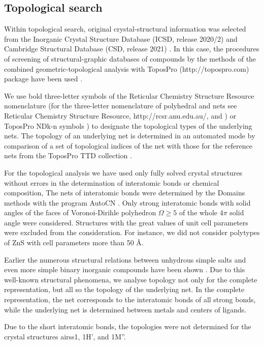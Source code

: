 \documentclass[a4paperm]{article}
\begin{document}
\subsection*{Topological search}

Within topological search, original crystal-structural information was selected from the Inorganic Crystal Structure Database (ICSD, release 2020/2) \cite{icsd_1} and Cambridge Structural Database (CSD, release 2021) \cite{icsd_2}.
In this case, the procedures of screening of structural-graphic databases of compounds by the methods of the combined geometric-topological analysis with ToposPro (http://topospro.com) package have been used \cite{topos_1}. 

We use bold three-letter symbols of the Reticular Chemistry Structure Resource nomenclature (for the three-letter nomenclature of polyhedral and nets see Reticular Chemistry Structure Resource, http://rcsr.anu.edu.au/, and \cite{rcsr}) or ToposPro NDk-n symbols \cite{rcsr_2}) to designate the topological types of the underlying nets. 
The topology of an underlying net is determined in an automated mode by comparison of a set of topological indices of the net with those for the reference nets from the ToposPro TTD collection \cite{TTD}.

For the topological analysis we have used only fully solved crystal structures without errors in the determination of interatomic bonds or chemical composition,
The nets of interatomic bonds were determined by the Domains methods with the program AutoCN \cite{blatov2016_rods}. 
Only strong interatomic bonds  with solid angles of the faces of Voronoi-Dirihle polyhedron $\Omega \geq 5 $ of the whole 4$\pi$ solid angle were considered.
Structures with the great values of unit cell parameters were excluded from the consideration.
For instance, we did not consider polytypes of ZnS with cell parameters more than 50 \AA.

Earlier the numerous structural relations between unhydrous simple salts and even more simple binary inorganic compounds have been shown \cite{blatov2011_salts, medrish2020_zintl}. 
Due to this well-known structural phenomena, we analyse topology not only for the complete  representation, but all so the topology of the underlying net.
In the complete representation, the net corresponds to the interatomic bonds of all strong bonds, while the underlying net is determined between metals and centers of ligands.

Due to the short interatomic bonds, the topologies were not determined for the crystal structures airss1, 1H', and  1M''.
\end{document}
